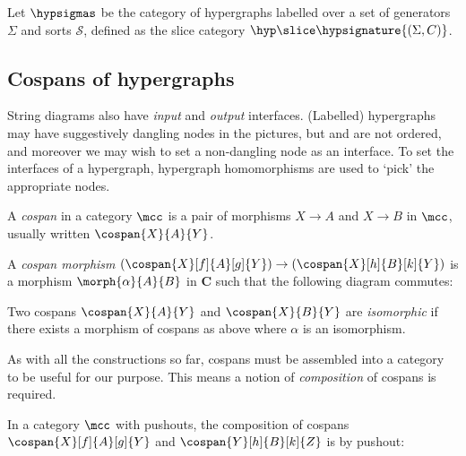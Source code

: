 \begin{definition}
    Let \(\hypsigmas\) be the category of hypergraphs labelled over a set of
    generators \(\Sigma\) and sorts \(\mathcal{S}\), defined as the slice category
    \(\hyp \slice \hypsignature{(\Sigma,C)}\).
\end{definition}

\begin{example}
\end{example}

\subsection{Cospans of hypergraphs}

String diagrams also have \emph{input} and \emph{output} interfaces.
(Labelled) hypergraphs may have suggestively dangling nodes in the pictures,
but and are not ordered, and moreover we may wish to set a non-dangling node
as an interface.
To set the interfaces of a hypergraph, hypergraph homomorphisms are used
to `pick' the appropriate nodes.

\begin{definition}[Cospan]
    A \emph{cospan} in a category \(\mcc\) is a pair of morphisms \(X \to A\)
    and \(X \to B\) in \(\mcc\), usually written \(\cospan{X}{A}{Y}\).

    A \emph{cospan morphism} \(
        (\cospan{X}[f]{A}[g]{Y}) \to (\cospan{X}[h]{B}[k]{Y})
    \) is a morphism \(\morph{\alpha}{A}{B}\) in \(\mathbf{C}\)
    such that the following diagram commutes:
    \begin{center}
        
    \end{center}
%
    Two cospans \(\cospan{X}{A}{Y}\) and \(\cospan{X}{B}{Y}\) are
    \emph{isomorphic} if there exists a morphism of cospans as above where
    \(\alpha\) is an isomorphism.
\end{definition}


As with all the constructions so far, cospans must be assembled into a category
to be useful for our purpose.
This means a notion of \emph{composition} of cospans is required.

\begin{definition}
    \label{def:cospan-composition}
    In a category \(\mcc\) with pushouts, the composition of cospans
    \(\cospan{X}[f]{A}[g]{Y}\) and \(\cospan{Y}[h]{B}[k]{Z}\) is by pushout:
    \begin{center}
        
    \end{center}
\end{definition}

